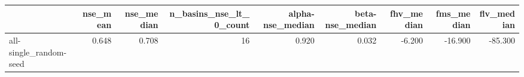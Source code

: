 \begin{tabular}{lrrrrrrrr}
\toprule
 & nse_mean & nse_median & n_basins_nse_lt_0_count & alpha-nse_median & beta-nse_median & fhv_median & fms_median & flv_median \\
\midrule
all-single_random-seed & 0.648 & 0.708 & 16 & 0.920 & 0.032 & -6.200 & -16.900 & -85.300 \\
\bottomrule
\end{tabular}
